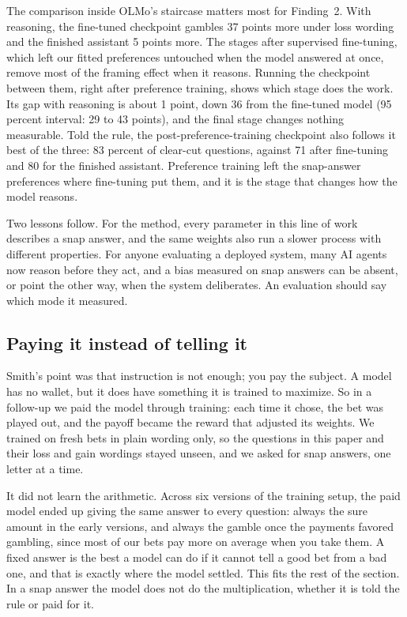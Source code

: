 \documentclass[11pt]{article}
\begin{document}
The comparison inside OLMo's staircase matters most for Finding~2. With reasoning, the fine-tuned
checkpoint gambles 37 points more under loss wording and the finished assistant 5 points more. The
stages after supervised fine-tuning, which left our fitted preferences untouched when the model
answered at once, remove most of the framing effect when it reasons. Running the checkpoint between
them, right after preference training, shows which stage does the work. Its gap with reasoning is about 1
point, down 36 from the fine-tuned model (95 percent interval: 29 to 43 points), and the final stage
changes nothing measurable. Told the rule, the post-preference-training checkpoint also follows it best
of the three: 83 percent of clear-cut questions, against 71 after fine-tuning and 80 for the finished
assistant. Preference training left the snap-answer preferences where fine-tuning put them, and it is
the stage that changes how the model reasons.

Two lessons follow. For the method, every parameter in this line of work describes a snap answer, and
the same weights also run a slower process with different properties. For anyone evaluating a
deployed system, many AI agents now reason before they act, and a bias measured on snap answers can be
absent, or point the other way, when the system deliberates. An evaluation should say which mode it
measured.

\subsection{Paying it instead of telling it}

Smith's point was that instruction is not enough; you pay the subject. A model has no wallet, but it
does have something it is trained to maximize. So in a follow-up we paid the model through training:
each time it chose, the bet was played out, and the payoff became the reward that adjusted its weights.
We trained on fresh bets in plain wording only, so the questions in this paper and their loss and gain
wordings stayed unseen, and we asked for snap answers, one letter at a time.

It did not learn the arithmetic. Across six versions of the training setup, the paid model ended up
giving the same answer to every question: always the sure amount in the early versions, and always
the gamble once the payments favored gambling, since most of our bets pay more on average when
you take them. A fixed answer is the best a model can do if it cannot tell a good bet from a bad one,
and that is exactly where the model settled. This fits the rest of the section. In a snap answer the
model does not do the multiplication, whether it is told the rule or paid for it.
\end{document}
